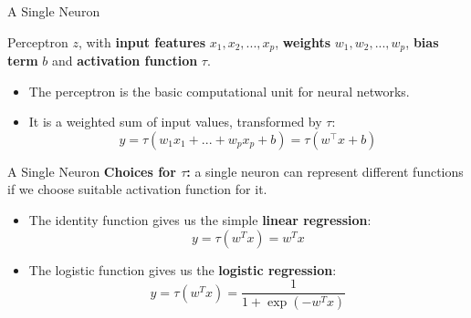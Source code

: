 \begin{vbframe} {A Single Neuron}
\begin{figure}
\centering
{}
\end{figure}
\vspace{-2mm}
\footnotesize Perceptron $z$, with \textbf{input features} $x_1, x_2, ... ,x_p$, \textbf{weights} $w_1, w_2,... ,w_p$, \textbf{bias term} $b$ and \textbf{activation function} $\tau$.
\vspace{.2cm}
\normalsize
\begin{itemize}
\item The perceptron is the basic computational unit for neural networks.
\vspace{.2cm}
\item It is a weighted sum of input values, transformed by $\tau$:
\vspace{-1mm}
$$y = \tau(w_1x_1 + ... + w_px_p +  b) = \tau(w^\top x+b)$$
\end{itemize}
\end{vbframe}

\begin{vbframe}{A Single Neuron}
\textbf{Choices for $\tau$:} a single neuron can represent different functions if we choose suitable activation function for it.
\vspace{.5cm}
\begin{itemize}
\item The identity function gives us the simple \textbf{linear regression}:
$$y = \tau(w^Tx) = w^Tx$$
\vspace{.5cm}
\item The logistic function gives us the \textbf{logistic regression}:
$$y = \tau(w^Tx) = \frac{1}{1 + \exp(-w^Tx)}$$
\end{itemize}
\end{vbframe}

